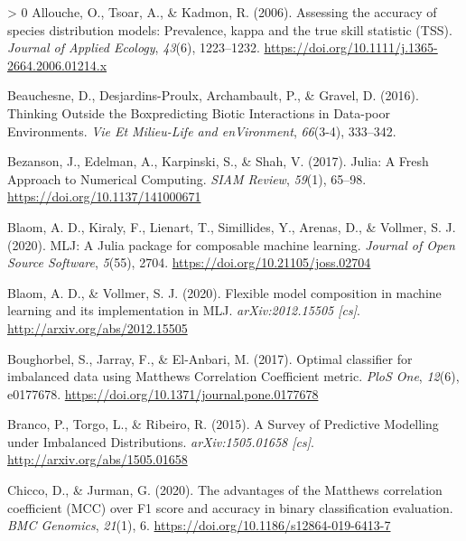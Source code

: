 \documentclass[10pt,oneside]{article}
\newlength{\cslhangindent}
\newenvironment{CSLReferences}[3] %
 {%
  \setlength{\parindent}{0pt}
  \ifodd #1 \everypar{\setlength{\hangindent}{\cslhangindent}}\ignorespaces\fi
  \ifnum #2 > 0
  \setlength{\parskip}{#2\baselineskip}
  \fi
 }%
 {}
\begin{document}
\hypertarget{refs}{}
\begin{CSLReferences}{1}{0}
\leavevmode\hypertarget{ref-Allouche2006AssAcc}{}%
Allouche, O., Tsoar, A., \& Kadmon, R. (2006). Assessing the accuracy of
species distribution models: Prevalence, kappa and the true skill
statistic (TSS). \emph{Journal of Applied Ecology}, \emph{43}(6),
1223--1232. \url{https://doi.org/10.1111/j.1365-2664.2006.01214.x}

\leavevmode\hypertarget{ref-Beauchesne2016ThiOut}{}%
Beauchesne, D., Desjardins-Proulx, Archambault, P., \& Gravel, D.
(2016). Thinking Outside the Boxpredicting Biotic Interactions in
Data-poor Environments. \emph{Vie Et Milieu-Life and enVironment},
\emph{66}(3-4), 333--342.

\leavevmode\hypertarget{ref-Bezanson2017JulFre}{}%
Bezanson, J., Edelman, A., Karpinski, S., \& Shah, V. (2017). Julia: A
Fresh Approach to Numerical Computing. \emph{SIAM Review}, \emph{59}(1),
65--98. \url{https://doi.org/10.1137/141000671}

\leavevmode\hypertarget{ref-Blaom2020MljJul}{}%
Blaom, A. D., Kiraly, F., Lienart, T., Simillides, Y., Arenas, D., \&
Vollmer, S. J. (2020). MLJ: A Julia package for composable machine
learning. \emph{Journal of Open Source Software}, \emph{5}(55), 2704.
\url{https://doi.org/10.21105/joss.02704}

\leavevmode\hypertarget{ref-Blaom2020FleMod}{}%
Blaom, A. D., \& Vollmer, S. J. (2020). Flexible model composition in
machine learning and its implementation in MLJ. \emph{arXiv:2012.15505
{[}cs{]}}. \url{http://arxiv.org/abs/2012.15505}

\leavevmode\hypertarget{ref-Boughorbel2017OptCla}{}%
Boughorbel, S., Jarray, F., \& El-Anbari, M. (2017). Optimal classifier
for imbalanced data using Matthews Correlation Coefficient metric.
\emph{PloS One}, \emph{12}(6), e0177678.
\url{https://doi.org/10.1371/journal.pone.0177678}

\leavevmode\hypertarget{ref-Branco2015SurPre}{}%
Branco, P., Torgo, L., \& Ribeiro, R. (2015). A Survey of Predictive
Modelling under Imbalanced Distributions. \emph{arXiv:1505.01658
{[}cs{]}}. \url{http://arxiv.org/abs/1505.01658}

\leavevmode\hypertarget{ref-Chicco2020AdvMat}{}%
Chicco, D., \& Jurman, G. (2020). The advantages of the Matthews
correlation coefficient (MCC) over F1 score and accuracy in binary
classification evaluation. \emph{BMC Genomics}, \emph{21}(1), 6.
\url{https://doi.org/10.1186/s12864-019-6413-7}


\end{CSLReferences}
\end{document}
